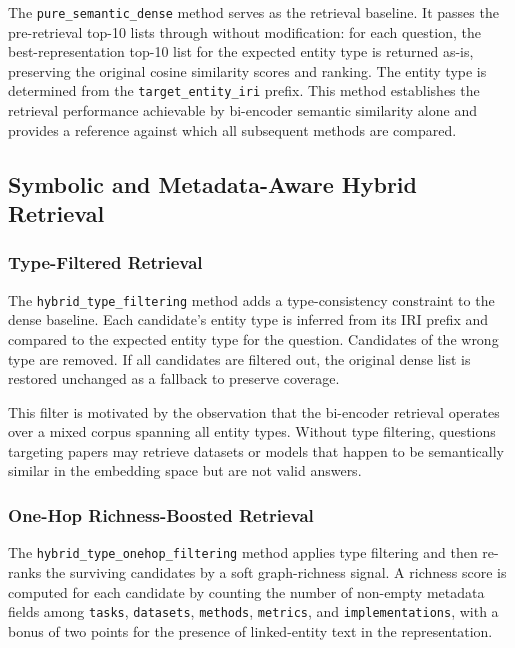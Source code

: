 The \texttt{pure\_semantic\_dense} method serves as the retrieval baseline.
It passes the pre-retrieval top-10 lists through without modification: for
each question, the best-representation top-10 list for the expected entity
type is returned as-is, preserving the original cosine similarity scores and
ranking.
The entity type is determined from the \texttt{target\_entity\_iri} prefix.
This method establishes the retrieval performance achievable by bi-encoder
semantic similarity alone and provides a reference against which all
subsequent methods are compared.

\subsection{Symbolic and Metadata-Aware Hybrid Retrieval}
\label{subsec:hybrid_retrieval}

\subsubsection{Type-Filtered Retrieval}
\label{subsubsec:type_filtering}

The \texttt{hybrid\_type\_filtering} method adds a type-consistency
constraint to the dense baseline.
Each candidate's entity type is inferred from its IRI prefix and compared to
the expected entity type for the question.
Candidates of the wrong type are removed.
If all candidates are filtered out, the original dense list is restored
unchanged as a fallback to preserve coverage.

This filter is motivated by the observation that the bi-encoder retrieval
operates over a mixed corpus spanning all entity types.
Without type filtering, questions targeting papers may retrieve datasets or
models that happen to be semantically similar in the embedding space but are
not valid answers.

\subsubsection{One-Hop Richness-Boosted Retrieval}
\label{subsubsec:onehop_filtering}

The \texttt{hybrid\_type\_onehop\_filtering} method applies type filtering
and then re-ranks the surviving candidates by a soft graph-richness signal.
A richness score is computed for each candidate by counting the number of
non-empty metadata fields among \texttt{tasks}, \texttt{datasets},
\texttt{methods}, \texttt{metrics}, and \texttt{implementations}, with a
bonus of two points for the presence of linked-entity text in the
representation.

